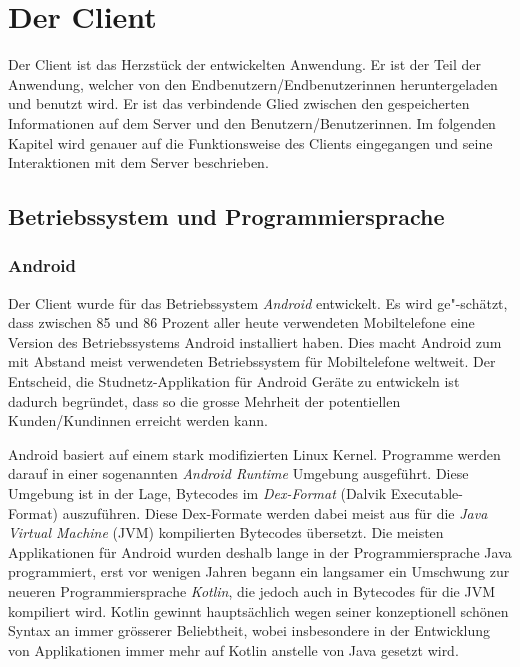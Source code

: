 \documentclass[../main.tex]{subfiles}
\begin{document}
	\chapter{Der Client}
	Der Client ist das Herzstück der entwickelten Anwendung. Er ist der Teil der Anwendung, welcher von den Endbenutzern/Endbenutzerinnen heruntergeladen und benutzt wird. Er ist das verbindende Glied zwischen den gespeicherten Informationen auf dem Server und den Benutzern/Benutzerinnen. Im folgenden Kapitel wird genauer auf die Funktionsweise des Clients eingegangen und seine Interaktionen mit dem Server beschrieben.
	
	\section{Betriebssystem und Programmiersprache}
	
	\subsection{Android}
	Der Client wurde für das Betriebssystem \emph{Android} entwickelt. Es wird ge"-schätzt, dass zwischen 85 und 86 Prozent aller heute verwendeten Mobiltelefone eine Version des Betriebssystems Android installiert haben. Dies macht Android zum mit Abstand meist verwendeten Betriebssystem für Mobiltelefone weltweit. Der Entscheid, die Studnetz-Applikation für Android Geräte zu entwickeln ist dadurch begründet, dass so die grosse Mehrheit der potentiellen Kunden/Kundinnen erreicht werden kann. \cite{android} %
	
	Android basiert auf einem stark modifizierten Linux Kernel. Programme werden darauf in einer sogenannten \emph{Android Runtime} Umgebung ausgeführt. Diese Umgebung ist in der Lage, Bytecodes im \emph{Dex-Format} (Dalvik Executable-Format) auszuführen. Diese Dex-Formate werden dabei meist aus für die \emph{Java Virtual Machine} (JVM) kompilierten Bytecodes übersetzt. Die meisten Applikationen für Android wurden deshalb lange in der Programmiersprache Java programmiert, erst vor wenigen Jahren begann ein langsamer ein Umschwung zur neueren Programmiersprache \emph{Kotlin}, die jedoch auch in Bytecodes für die JVM kompiliert wird. Kotlin gewinnt hauptsächlich wegen seiner konzeptionell schönen Syntax an immer grösserer Beliebtheit, wobei insbesondere in der Entwicklung von Applikationen immer mehr auf Kotlin anstelle von Java gesetzt wird. \cite{androidJava}
	
\end{document}
